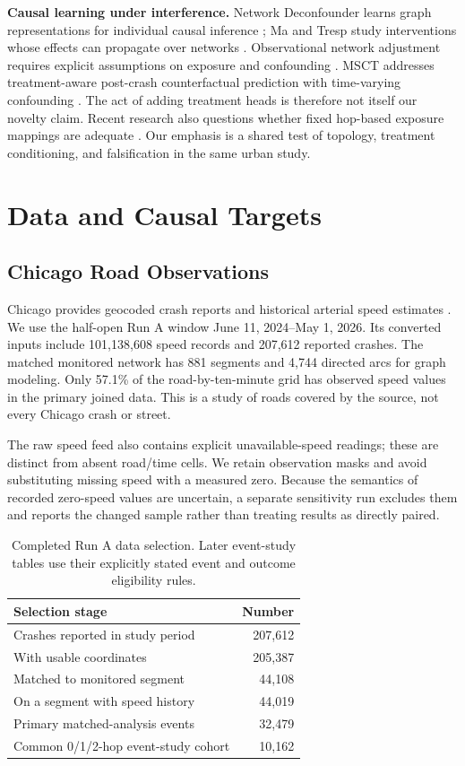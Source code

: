 \documentclass[sigconf,nonacm]{acmart}
\begin{document}
\textbf{Causal learning under interference.} Network Deconfounder
learns graph representations for individual causal inference
\cite{guo2020network}; Ma and Tresp study interventions whose effects
can propagate over networks \cite{ma2021interference}. Observational
network adjustment requires explicit assumptions on exposure and
confounding \cite{forastiere2022interference}. MSCT addresses
treatment-aware post-crash counterfactual prediction with
time-varying confounding \cite{li2024msct}. The act of adding treatment
heads is therefore not itself our novelty claim. Recent research
also questions whether fixed hop-based exposure mappings are adequate
\cite{huber2026exposure}. Our emphasis is a shared test of topology,
treatment conditioning, and falsification in the same urban study.

\section{Data and Causal Targets}
\subsection{Chicago Road Observations}
Chicago provides geocoded crash reports and historical arterial speed
estimates \cite{chicagoCrashes,chicagoSpeeds}. We use the half-open Run
A window June 11, 2024--May 1, 2026. Its converted inputs include
101,138,608 speed records and 207,612 reported crashes. The matched
monitored network has 881 segments and 4,744 directed arcs for graph
modeling. Only 57.1\% of the road-by-ten-minute grid has observed speed
values in the primary joined data. This is a study of roads covered by
the source, not every Chicago crash or street.

The raw speed feed also contains explicit unavailable-speed readings;
these are distinct from absent road/time cells. We retain observation
masks and avoid substituting missing speed with a measured zero.
Because the semantics of recorded zero-speed values are uncertain, a
separate sensitivity run excludes them and reports the changed sample
rather than treating results as directly paired.

\begin{table}[t]
\centering
\caption{Completed Run A data selection. Later event-study tables
use their explicitly stated event and outcome eligibility rules.}
\label{tab:funnel}
\footnotesize
\begin{tabular}{lr}
\toprule
Selection stage & Number \\
\midrule
Crashes reported in study period & 207,612 \\
With usable coordinates & 205,387 \\
Matched to monitored segment & 44,108 \\
On a segment with speed history & 44,019 \\
Primary matched-analysis events & 32,479 \\
Common 0/1/2-hop event-study cohort & 10,162 \\
\bottomrule
\end{tabular}
\end{table}
\end{document}
